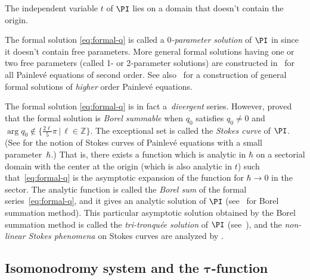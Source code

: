 \begin{ass}
The independent variable $t$ of $\PI$
lies on a domain that doesn't contain the origin.
\end{ass}


\begin{rem}
The formal solution \eqref{eq:formal-q} is called a
{\em $0$-parameter solution} of $\PI$ in \cite{KT05}
since it doesn't contain free parameters.
More general formal solutions having
one or two free para\-me\-ters (called 1- or 2-parameter solutions)
are constructed in~\cite{AKT-P} for all Painlev\'e equations
of second order.
See also~\cite{Umeta} for a construction of general formal
solutions of {\em higher} order Painlev\'e equations.
\end{rem}

\begin{rem}\sloppy
The formal solution \eqref{eq:formal-q} is in fact a~{\em divergent} series.
However, \cite[Theo\-rem~1.1]{Kamimoto-Koike} proved that
the formal solution is {\em Borel summable} when
$q_{0}$ satisf\/ies $q_{0} \ne 0$ and
\mbox{$\arg q_{0} \notin \{ \frac{2\ell}{5}\pi \,|\,
\ell \in {\mathbb Z} \}$}.
The exceptional set is called the {\em Stokes curve} of $\PI$.
(See \cite[Def\/ini\-tion~2.1]{KT-PI} for the notion of
Stokes curves of Painlev\'e equations
with a small parameter~$\hbar$.)
That is, there exists a function
which is analytic in $\hbar$ on a sectorial domain
with the center at the origin (which is also analytic in $t$)
such that~\eqref{eq:formal-q} is the asymptotic expansion
of the function for $\hbar \rightarrow 0$ in the sector.
The analytic function is called the {\em Borel sum}
of the formal series~\eqref{eq:formal-q}, and
it gives an analytic solution of $\PI$
(see~\cite{Costin08} for Borel summation method).
This particular asymptotic solution obtained by
the Borel summation method is called
the {\em tri-tronqu\'ee solution}
of $\PI$ (see~\cite{Joshi-Kitaev}), and the
{\em non-linear Stokes phenomena} on Stokes curves
are analyzed by \cite{FIKN, Kap, Takei}.
\end{rem}

\subsection[Isomonodromy system and the $\tau$-function]{Isomonodromy system and the $\boldsymbol{\tau}$-function}

